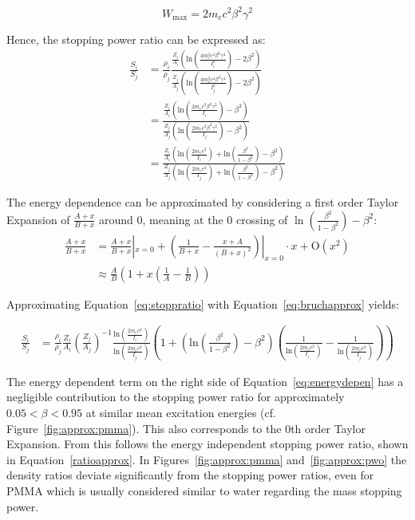 \documentclass{article}
\begin{document}
\begin{equation*}
    \label{eq:energytransferapprox}
    W_{\text{max}} = 2m_e c^2\beta^2\gamma^2
\end{equation*}

Hence, the stopping power ratio can be expressed as:
\begin{align}
    \label{eq:stoppratio}
    \frac{S_i}{S_j} &= \frac{\rho_i}{\rho_{j}}\frac{\frac{Z_i}{A_i}\left(\text{ln}\left(\frac{4m_e^2c^4\beta^4\gamma^4}{I_{i}^2}\right)-2\beta^2\right)}{\frac{Z_{j}}{A_j}\left(\text{ln}\left(\frac{4m_e^2c^4\beta^4\gamma^4}{I_{j}^2}\right)-2\beta^2\right)} \\
    &= \frac{\frac{Z_i}{A_i}\left(\text{ln}\left(\frac{2m_ec^2\beta^2\gamma^2}{I_{i}}\right)-\beta^2\right)}{\frac{Z_j}{A_j}\left(\text{ln}\left(\frac{2m_ec^2\beta^2\gamma^2}{I_j}\right)-\beta^2\right)} \\
    &= \frac{\frac{Z_i}{A_i}\left(\text{ln}\left(\frac{2m_ec^2}{I_{i}}\right)+\text{ln}(\frac{\beta^2}{1-\beta^2})-\beta^2\right)}{\frac{Z_j}{A_j}\left(\text{ln}\left(\frac{2m_ec^2}{I_j}\right)+\text{ln}(\frac{\beta^2}{1-\beta^2})-\beta^2\right)} \label{eq:stoppratio:2}
\end{align}

The energy dependence can be approximated by considering a first order Taylor Expansion of $\frac{A+x}{B+x}$ around 0, meaning at the 0 crossing of $\ln(\frac{\beta^2}{1-\beta^2})-\beta^2$:
\begin{align}
    \frac{A+x}{B+x}  &= \frac{A+x}{B+x}|_{x=0} + (\frac{1}{B+x}-\frac{x+A}{(B+x)^2})|_{x=0}\cdot x + \text{O}(x^2)\\
    &\approx \frac{A}{B} \left(1+x\left(\frac{1}{A}-\frac{1}{B}\right)\right)\label{eq:bruchapprox}
\end{align}

Approximating Equation~\ref{eq:stoppratio} with Equation~\ref{eq:bruchapprox} yields:

\begin{align}
    \label{eq:energydepen}
    \frac{S_i}{S_j} &= \frac{\rho_i}{\rho_j}\frac{Z_i}{A_i}\left(\frac{Z_j}{A_j}\right)^{-1}\frac{\text{ln}\left(\frac{2m_ec^2}{I_i}\right)}{\text{ln}\left(\frac{2m_ec^2}{I_j}\right)}\left(1+\left(\text{ln}(\frac{\beta^2}{1-\beta^2})-\beta^2\right)\left(\frac{1}{\text{ln}\left(\frac{2m_ec^2}{I_{i}}\right)}-\frac{1}{\text{ln}\left(\frac{2m_ec^2}{I_j}\right)}\right)\right)
\end{align}

The energy dependent term on the right side of Equation~\ref{eq:energydepen} has a negligible contribution to the stopping power ratio for approximately $0.05<\beta< 0.95$ at similar mean excitation energies (cf. Figure~\ref{fig:approx:pmma}).
This also corresponds to the 0th order Taylor Expansion.
From this follows the energy independent stopping power ratio, shown in Equation~\ref{ratioapprox}.
In Figures~\ref{fig:approx:pmma} and~\ref{fig:approx:pwo}  the density ratios deviate significantly from the stopping power ratios, even for PMMA which is usually considered similar to water regarding the mass stopping power.
\end{document}
